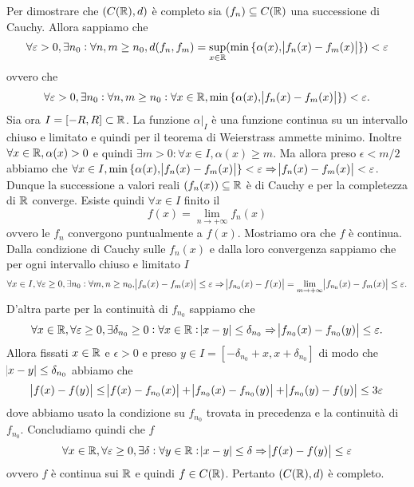 Per dimostrare che $ (C(\mathbb{R}), d) $ è completo sia $ (f_n) \subseteq C(\mathbb{R}) $ una successione di Cauchy. Allora sappiamo che \[\forall \varepsilon > 0, \exists n_0 : \forall n, m \geq n_0, d(f_n, f_m) =  \sup_{x \in \mathbb{R}}(\min{\{\alpha(x), \abs{f_n(x) - f_m(x)}\}}) < \varepsilon\] ovvero che \[\forall \varepsilon > 0, \exists n_0 : \forall n, m \geq n_0 : \forall x \in \mathbb{R}, \min{\{\alpha(x), \abs{f_n(x) - f_m(x)}\}}) < \varepsilon.\] Sia ora $ I = [-R, R] \subset \mathbb{R} $. La funzione $ \alpha |_{I} $ è una funzione continua su un intervallo chiuso e limitato e quindi per il teorema di Weierstrass ammette minimo. Inoltre $ \forall x \in \mathbb{R}, \alpha(x) > 0 $ e quindi $ \exists m > 0 : \forall x \in I, \alpha(x) \geq m $. Ma allora preso $ \epsilon < m/2 $ abbiamo che $ \forall x \in I, \min{\{\alpha(x), \abs{f_n(x) - f_m(x)}\}} < \varepsilon \Rightarrow  \abs{f_n(x) - f_m(x)} < \varepsilon $. Dunque la successione a valori reali $ (f_n(x)) \subseteq \mathbb{R} $ è di Cauchy e per la completezza di $ \mathbb{R} $ converge. Esiste quindi $ \forall x \in I $ finito il \[f(x) = \lim_{n \to +\infty} f_n(x)\] ovvero le $ f_n $ convergono puntualmente a $ f(x) $. Mostriamo ora che $ f $ è continua. Dalla condizione di Cauchy sulle $ f_n(x) $ e dalla loro convergenza sappiamo che per ogni intervallo chiuso e limitato $ I $ \[\forall x \in I, \forall \varepsilon \geq 0, \exists n_0 : \forall m, n \geq n_0, \abs{f_n(x) - f_m(x)} \leq \varepsilon \Rightarrow \abs{f_{n_0}(x) - f(x)} = \lim_{m \to +\infty} \abs{f_{n_0}(x) - f_m(x)} \leq \varepsilon.\] D'altra parte per la continuità di $ f_{n_0} $ sappiamo che \[\forall x \in \mathbb{R}, \forall \varepsilon \geq 0, \exists \delta_{n_0} \geq 0 : \forall x \in \mathbb{R} : \abs{x - y} \leq \delta_{n_0} \Rightarrow \abs{f_{n_0}(x) - f_{n_0}(y)} \leq \varepsilon.\] Allora fissati $ x \in \mathbb{R} $ e $ \epsilon > 0 $ e preso $ y \in I = [- \delta_{n_0} + x, x + \delta_{n_0}] $ di modo che $ \abs{x - y} \leq \delta_{n_0} $ abbiamo che \[\abs{f(x) - f(y)} \leq \abs{f(x) - f_{n_0}(x)} + \abs{f_{n_0}(x) - f_{n_0}(y)} + \abs{f_{n_0}(y) - f(y)} \leq 3\varepsilon\] dove abbiamo usato la condizione su $ f_{n_0} $ trovata in precedenza e la continuità di $ f_{n_0} $. Concludiamo quindi che $ f $ \[\forall x \in \mathbb{R}, \forall \varepsilon \geq 0, \exists \delta : \forall y \in \mathbb{R} : \abs{x - y} \leq \delta \Rightarrow \abs{f(x) - f(y)} \leq \varepsilon\] ovvero $ f $ è continua sui $ \mathbb{R} $ e quindi $ f \in C(\mathbb{R}) $. Pertanto $ (C(\mathbb{R}), d) $ è completo.

